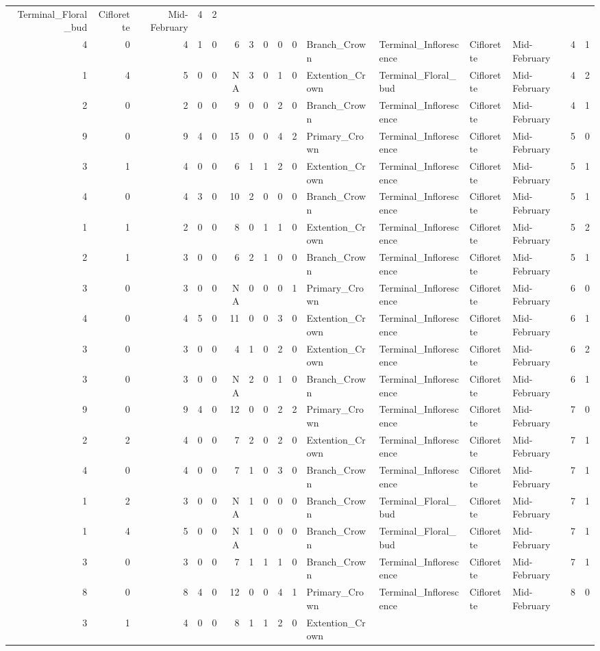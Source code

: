\documentclass[]{article}
\begin{document}
\begin{longtable}[]{@{}rrrrrrrrrrllllrl@{}}
Terminal\_Floral\_bud & Ciflorette & Mid-February & 4 & 2\tabularnewline
4 & 0 & 4 & 1 & 0 & 6 & 3 & 0 & 0 & 0 & Branch\_Crown &
Terminal\_Inflorescence & Ciflorette & Mid-February & 4 &
1\tabularnewline
1 & 4 & 5 & 0 & 0 & NA & 3 & 0 & 1 & 0 & Extention\_Crown &
Terminal\_Floral\_bud & Ciflorette & Mid-February & 4 & 2\tabularnewline
2 & 0 & 2 & 0 & 0 & 9 & 0 & 0 & 2 & 0 & Branch\_Crown &
Terminal\_Inflorescence & Ciflorette & Mid-February & 4 &
1\tabularnewline
9 & 0 & 9 & 4 & 0 & 15 & 0 & 0 & 4 & 2 & Primary\_Crown &
Terminal\_Inflorescence & Ciflorette & Mid-February & 5 &
0\tabularnewline
3 & 1 & 4 & 0 & 0 & 6 & 1 & 1 & 2 & 0 & Extention\_Crown &
Terminal\_Inflorescence & Ciflorette & Mid-February & 5 &
1\tabularnewline
4 & 0 & 4 & 3 & 0 & 10 & 2 & 0 & 0 & 0 & Branch\_Crown &
Terminal\_Inflorescence & Ciflorette & Mid-February & 5 &
1\tabularnewline
1 & 1 & 2 & 0 & 0 & 8 & 0 & 1 & 1 & 0 & Extention\_Crown &
Terminal\_Inflorescence & Ciflorette & Mid-February & 5 &
2\tabularnewline
2 & 1 & 3 & 0 & 0 & 6 & 2 & 1 & 0 & 0 & Branch\_Crown &
Terminal\_Inflorescence & Ciflorette & Mid-February & 5 &
1\tabularnewline
3 & 0 & 3 & 0 & 0 & NA & 0 & 0 & 0 & 1 & Primary\_Crown &
Terminal\_Inflorescence & Ciflorette & Mid-February & 6 &
0\tabularnewline
4 & 0 & 4 & 5 & 0 & 11 & 0 & 0 & 3 & 0 & Extention\_Crown &
Terminal\_Inflorescence & Ciflorette & Mid-February & 6 &
1\tabularnewline
3 & 0 & 3 & 0 & 0 & 4 & 1 & 0 & 2 & 0 & Extention\_Crown &
Terminal\_Inflorescence & Ciflorette & Mid-February & 6 &
2\tabularnewline
3 & 0 & 3 & 0 & 0 & NA & 2 & 0 & 1 & 0 & Branch\_Crown &
Terminal\_Inflorescence & Ciflorette & Mid-February & 6 &
1\tabularnewline
9 & 0 & 9 & 4 & 0 & 12 & 0 & 0 & 2 & 2 & Primary\_Crown &
Terminal\_Inflorescence & Ciflorette & Mid-February & 7 &
0\tabularnewline
2 & 2 & 4 & 0 & 0 & 7 & 2 & 0 & 2 & 0 & Extention\_Crown &
Terminal\_Inflorescence & Ciflorette & Mid-February & 7 &
1\tabularnewline
4 & 0 & 4 & 0 & 0 & 7 & 1 & 0 & 3 & 0 & Branch\_Crown &
Terminal\_Inflorescence & Ciflorette & Mid-February & 7 &
1\tabularnewline
1 & 2 & 3 & 0 & 0 & NA & 1 & 0 & 0 & 0 & Branch\_Crown &
Terminal\_Floral\_bud & Ciflorette & Mid-February & 7 & 1\tabularnewline
1 & 4 & 5 & 0 & 0 & NA & 1 & 0 & 0 & 0 & Branch\_Crown &
Terminal\_Floral\_bud & Ciflorette & Mid-February & 7 & 1\tabularnewline
3 & 0 & 3 & 0 & 0 & 7 & 1 & 1 & 1 & 0 & Branch\_Crown &
Terminal\_Inflorescence & Ciflorette & Mid-February & 7 &
1\tabularnewline
8 & 0 & 8 & 4 & 0 & 12 & 0 & 0 & 4 & 1 & Primary\_Crown &
Terminal\_Inflorescence & Ciflorette & Mid-February & 8 &
0\tabularnewline
3 & 1 & 4 & 0 & 0 & 8 & 1 & 1 & 2 & 0 & Extention\_Crown &

\end{longtable}
\end{document}
